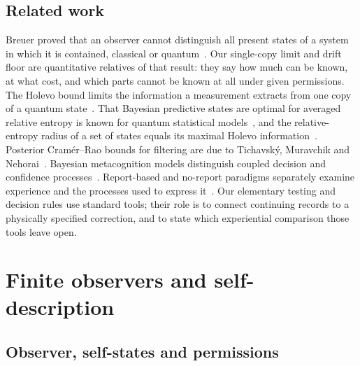 \documentclass[12pt]{article}
\theoremstyle{definition}
\theoremstyle{remark}
\begin{document}
\subsection{Related work}

Breuer proved that an observer cannot distinguish all present states of a system in which it is contained, classical or quantum~\cite{Breuer1995}. Our single-copy limit and drift floor are quantitative relatives of that result: they say how much can be known, at what cost, and which parts cannot be known at all under given permissions. The Holevo bound limits the information a measurement extracts from one copy of a quantum state~\cite{Holevo1973}. That Bayesian predictive states are optimal for averaged relative entropy is known for quantum statistical models~\cite{TanakaKomaki2005}, and the relative-entropy radius of a set of states equals its maximal Holevo information~\cite{SchumacherWestmoreland2001}. Posterior Cram\'er--Rao bounds for filtering are due to Tichavsk\'y, Muravchik and Nehorai~\cite{Tichavsky1998}. Bayesian metacognition models distinguish coupled decision and confidence processes~\cite{FlemingDaw2017}. Report-based and no-report paradigms separately examine experience and the processes used to express it~\cite{Tsuchiya2015}. Our elementary testing and decision rules use standard tools; their role is to connect continuing records to a physically specified correction, and to state which experiential comparison those tools leave open.

\section{Finite observers and self-description}\label{sec:2}

\subsection{Observer, self-states and permissions}
\end{document}
